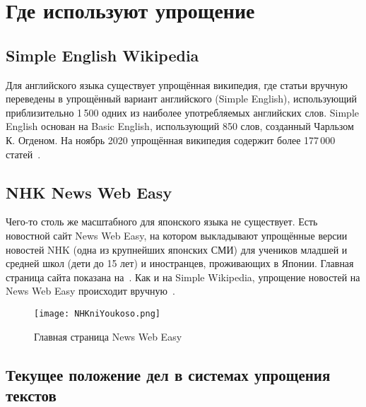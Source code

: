 

\chapter{Где используют упрощение}\label{ch3}


\section{Simple English Wikipedia}


Для английского языка существует упрощённая википедия, где статьи вручную переведены в упрощённый вариант английского (Simple English), использующий приблизительно 1\,500 одних из наиболее употребляемых английских слов.
Simple English основан на Basic English, использующий 850 слов, созданный Чарльзом К. Огденом.
На ноябрь 2020 упрощённая википедия содержит более 177\,000 статей~\cite{SimpleWiki}.


\section{NHK News Web Easy}


Чего-то столь же масштабного для японского языка не существует.
Есть новостной сайт News Web Easy, на котором выкладывают упрощённые версии новостей NHK (одна из крупнейших японских СМИ) для учеников младшей и средней школ (дети до 15 лет) и иностранцев, проживающих в Японии.
Главная страница сайта показана на~.
Как и на Simple Wikipedia, упрощение новостей на News Web Easy происходит вручную~\cite{NHKnews}.
\begin{figure}[H]%
  \centering
  \texttt{[image: NHKniYoukoso.png]}
  \caption{Главная страница News Web Easy}
  \label{NHK}
\end{figure}


\section{Текущее положение дел в системах упрощения текстов}


